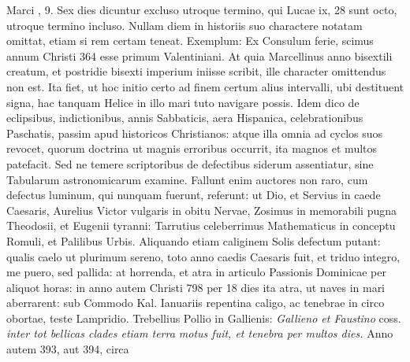  Marci , 9.
Sex
dies dicuntur excluso utroque termino, qui Lucae {ix}, 28
 sunt octo,
utroque termino incluso.
Nullam diem in historiis suo charactere
notatam omittat, etiam si rem certam teneat.
Exemplum: Ex Consulum
ferie, scimus annum Christi 364 esse primum Valentiniani.
At quia Marcellinus anno bisextili creatum,
 et postridie bisexti imperium
iniisse scribit, ille character omittendus non est.
Ita fiet, ut
hoc initio certo ad finem certum alius intervalli, ubi destituent signa,
hac tanquam Helice in illo mari tuto navigare possis.
Idem dico de eclipsibus, indictionibus, annis Sabbaticis,
 aera Hispanica,
celebrationibus Paschatis, passim apud historicos Christianos: atque
illa omnia ad cyclos suos revocet, quorum doctrina ut magnis erroribus
occurrit, ita magnos et multos patefacit.
Sed ne temere scriptoribus
de defectibus siderum assentiatur, sine Tabularum astronomicarum
examine.
Fallunt enim auctores non raro, cum defectus
luminum, qui nunquam fuerunt, referunt: ut Dio, et Servius in
caede Caesaris, Aurelius Victor vulgaris in obitu Nervae, Zosimus in
memorabili pugna Theodosii, et Eugenii tyranni: Tarrutius celeberrimus
Mathematicus in conceptu Romuli, et Palilibus Urbis.
%
Aliquando etiam caliginem Solis defectum putant:
 qualis caelo ut plurimum
sereno, toto anno caedis Caesaris fuit, et triduo integro, me puero,
sed pallida: at horrenda, et atra in articulo Passionis Dominicae
per aliquot horas: in anno autem Christi 798 per 18 dies ita atra, ut
naves in mari aberrarent: sub Commodo Kal. Ianuariis repentina caligo,
ac tenebrae in circo obortae, teste Lampridio.
Trebellius Pollio in
Gallienis: \textit{Gallieno et Faustino}
 coss. \textit{inter tot bellicas clades etiam terra
motus fuit, et tenebra per multos dies.}
Anno autem 393, aut 394, circa
